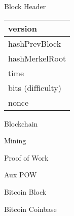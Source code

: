 \documentclass{beamer}
\begin{document}
\begin{frame}

    {\Huge Block Header}\\

    \vspace{5mm}

    \begin{tabular}{|l|}
    \hline
    version \\
    \hline
    hashPrevBlock \\
    \hline
    hashMerkelRoot \\
    \hline
    time \\
    \hline
    bits (difficulty)\\
    \hline
    nonce \\
    \hline
    \end{tabular}

\end{frame}

\begin{frame}

    {\Huge Blockchain}\\

\end{frame}

\begin{frame}

    {\Huge Mining}\\

\end{frame}

\begin{frame}

    {\Huge Proof of Work}\\

\end{frame}

\begin{frame}

    {\Huge Aux POW}\\

\end{frame}

\begin{frame}

    {\Huge Bitcoin Block}\\

\end{frame}

\begin{frame}

    {\Huge Bitcoin Coinbase}\\

\end{frame}
\end{document}
